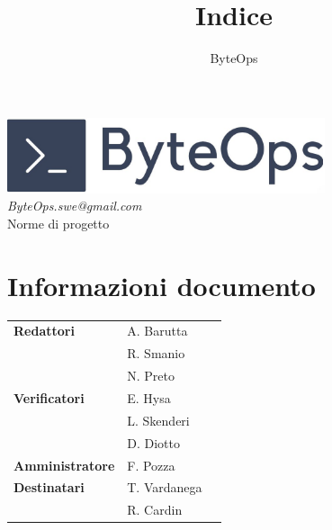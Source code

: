 \documentclass{article}
\title{\textbf{\fontsize{28}{6}\selectfont Indice}}
\author{\fontsize{14}{6}\selectfont ByteOps}
\date{}
\begin{document}
\pagestyle{fancy}
\begin{center}
    \includegraphics[width = 0.7\textwidth]{../Images/logo.png} \\
    \vspace{0.2cm}
    \textcolor[RGB]{60, 60, 60}{\textit{ByteOps.swe@gmail.com}} \\
    \vspace{2cm}
    \fontsize{16}{6}\selectfont Norme di progetto \\
    \vspace{0.5cm}
\end{center}

\section*{Informazioni documento}
\def\arraystretch{1.2}
\begin{tabular}{>{\raggedleft\arraybackslash}p{}|>{\raggedright\arraybackslash}p{}c}
    \hline
    \addlinespace 
    \textbf{Redattori}      & A. Barutta               \\ & R. Smanio \\ & N. Preto \vspace{10pt} \\
    \textbf{Verificatori}   & E. Hysa                  \\ & L. Skenderi \\ & D. Diotto \vspace{10pt} \\
    \textbf{Amministratore} & F. Pozza \vspace{10pt}   \\
    \textbf{Destinatari}    & T. Vardanega             \\ & R. Cardin \vspace{10pt} \\
\end{tabular}
\pagebreak

\end{document}
